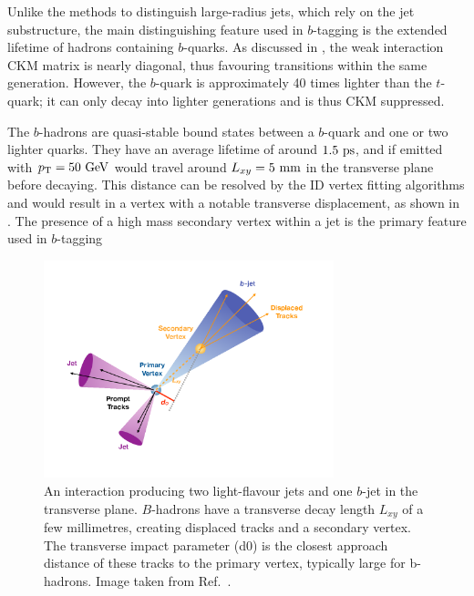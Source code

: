 Unlike the methods to distinguish large-radius jets, which rely on the jet substructure, the main distinguishing feature used in $b$-tagging is the extended lifetime of hadrons containing $b$-quarks.
As discussed in , the weak interaction CKM matrix is nearly diagonal, thus favouring transitions within the same generation.
However, the $b$-quark is approximately 40 times lighter than the $t$-quark; it can only decay into lighter generations and is thus CKM suppressed.

The $b$-hadrons are quasi-stable bound states between a $b$-quark and one or two lighter quarks.
They have an average lifetime of around $1.5~\ps$, and if emitted with $\pt=50~\GeV$ would travel around $L_{xy} = 5~\mm$ in the transverse plane before decaying.
This distance can be resolved by the ID vertex fitting algorithms and would result in a vertex with a notable transverse displacement, as shown in .
The presence of a high mass secondary vertex within a jet is the primary feature used in $b$-tagging

\begin{figure}[htb]
    \centering
    \includegraphics[width=0.75\textwidth]{Figures/cern_atlas/bjet.png}
    \caption{An interaction producing two light-flavour jets and one $b$-jet in the transverse plane. $B$-hadrons have a transverse decay length $L_{xy}$ of a few millimetres, creating displaced tracks and a secondary vertex. The transverse impact parameter (d0) is the closest approach distance of these tracks to the primary vertex, typically large for b-hadrons. Image taken from Ref.~\cite{BJetImage}.}
    \label{fig:btagging}
\end{figure}

